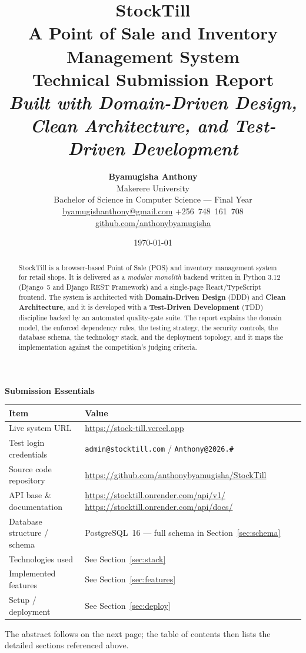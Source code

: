 \documentclass[11pt,a4paper]{article}
\title{\vspace{-2.2cm}\textbf{StockTill}\\[0.3em]
  \large A Point of Sale and Inventory Management System\\[0.3em]
  \normalsize Technical Submission Report\\[0.6em]
  \normalsize\emph{Built with Domain-Driven Design, Clean Architecture, and Test-Driven Development}}
\author{%
  \textbf{Byamugisha Anthony}\\[0.3em]
  Makerere University\\[0.2em]
  Bachelor of Science in Computer Science --- Final Year\\[0.4em]
  \small\href{mailto:byamugishanthony@gmail.com}{byamugishanthony@gmail.com}\quad
  \small +256~748~161~708\\[0.2em]
  \small\href{https://github.com/anthonybyamugisha/}{github.com/anthonybyamugisha}%
}
\date{\today}
\begin{document}
\maketitle

\vspace{0.4em}
\begin{center}
{\large\bfseries Submission Essentials}
\end{center}
\vspace{0.4em}

\noindent
\begin{tabular}{@{}p{}p{}@{}}
\toprule
\textbf{Item} & \textbf{Value} \\
\midrule
Live system URL & \url{https://stock-till.vercel.app} \\
Test login credentials & \texttt{admin@stocktill.com} \;/\; \texttt{Anthony@2026.\#} \\
Source code repository & \url{https://github.com/anthonybyamugisha/StockTill} \\
API base \& documentation & \url{https://stocktill.onrender.com/api/v1/} \quad
\url{https://stocktill.onrender.com/api/docs/} \\
Database structure / schema & PostgreSQL~16 --- full schema in Section~\ref{sec:schema} \\
Technologies used & See Section~\ref{sec:stack} \\
Implemented features & See Section~\ref{sec:features} \\
Setup / deployment & See Section~\ref{sec:deploy} \\
\bottomrule
\end{tabular}

\vspace{1em}
\noindent\small The abstract follows on the next page; the table of contents then lists the detailed
sections referenced above.

\newpage

\begin{abstract}
\noindent
StockTill is a browser-based Point of Sale (POS) and inventory management system for
retail shops. It is delivered as a \emph{modular monolith} backend written in Python 3.12
(Django~5 and Django REST Framework) and a single-page React/TypeScript frontend. The system
is architected with \textbf{Domain-Driven Design} (DDD) and \textbf{Clean Architecture}, and it is
developed with a \textbf{Test-Driven Development} (TDD) discipline backed by an automated
quality-gate suite. The report explains the domain model, the enforced dependency rules, the testing
strategy, the security controls, the database schema, the technology stack, and the deployment
topology, and it maps the implementation against the competition's judging criteria.
\end{abstract}
\end{document}
